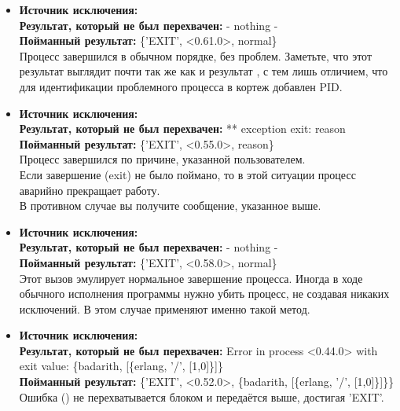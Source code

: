 \begin{itemize}
    \item \textbf{Источник исключения:} \\
    \textbf{Результат, который не был перехвачен:} - nothing -\\
    \textbf{Пойманный результат:} \{'EXIT', <0.61.0>, normal\}\\
    Процесс завершился в обычном порядке, без проблем.
    Заметьте, что этот результат выглядит почти так же как и результат , с тем лишь отличием, что для идентификации проблемного процесса в кортеж добавлен PID.\\
    \item \textbf{Источник исключения:} \\
    \textbf{Результат, который не был перехвачен:} ** exception exit: reason\\
    \textbf{Пойманный результат:} \{'EXIT', <0.55.0>, reason\}\\
    Процесс завершился по причине, указанной пользователем.\\
    Если завершение (exit) не было поймано, то в этой ситуации процесс аварийно прекращает работу.\\
    В противном случае вы получите сообщение, указанное выше.\\
    \item \textbf{Источник исключения:} \\
    \textbf{Результат, который не был перехвачен:} - nothing -\\
    \textbf{Пойманный результат:} \{'EXIT', <0.58.0>, normal\}\\
    Этот вызов эмулирует нормальное завершение процесса.
    Иногда в ходе обычного  исполнения программы нужно убить процесс, не создавая никаких исключений.
    В этом  случае применяют именно такой метод.\\
    \item \textbf{Источник исключения:} \\
    \textbf{Результат, который не был перехвачен:} Error in process <0.44.0> with exit value: \{badarith, [\{erlang, '/', [1,0]\}]\}\\
    \textbf{Пойманный результат:} \{'EXIT', <0.52.0>, \{badarith, [\{erlang, '/', [1,0]\}]\}\}\\
    Ошибка () не перехватывается блоком  и передаётся выше, достигая 'EXIT'.

\end{itemize}
